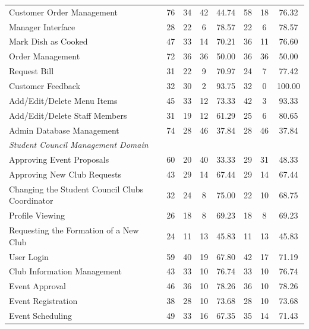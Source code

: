 \begin{landscape}
\begin{table}[h]
\begin{tabular}{lccccccc}
Customer Order Management & 76 & 34 & 42 & 44.74 & 58 & 18 & 76.32 \\
Manager Interface & 28 & 22 & 6 & 78.57 & 22 & 6 & 78.57 \\
Mark Dish as Cooked & 47 & 33 & 14 & 70.21 & 36 & 11 & 76.60 \\
Order Management & 72 & 36 & 36 & 50.00 & 36 & 36 & 50.00 \\
Request Bill & 31 & 22 & 9 & 70.97 & 24 & 7 & 77.42 \\
Customer Feedback & 32 & 30 & 2 & 93.75 & 32 & 0 & 100.00 \\
Add/Edit/Delete Menu Items & 45 & 33 & 12 & 73.33 & 42 & 3 & 93.33 \\
Add/Edit/Delete Staff Members & 31 & 19 & 12 & 61.29 & 25 & 6 & 80.65 \\
Admin Database Management & 74 & 28 & 46 & 37.84 & 28 & 46 & 37.84 \\
\midrule
\multicolumn{8}{l}{\textit{Student Council Management Domain}} \\
Approving Event Proposals & 60 & 20 & 40 & 33.33 & 29 & 31 & 48.33 \\
Approving New Club Requests & 43 & 29 & 14 & 67.44 & 29 & 14 & 67.44 \\
Changing the Student Council Clubs Coordinator & 32 & 24 & 8 & 75.00 & 22 & 10 & 68.75 \\
Profile Viewing & 26 & 18 & 8 & 69.23 & 18 & 8 & 69.23 \\
Requesting the Formation of a New Club & 24 & 11 & 13 & 45.83 & 11 & 13 & 45.83 \\
User Login & 59 & 40 & 19 & 67.80 & 42 & 17 & 71.19 \\
Club Information Management & 43 & 33 & 10 & 76.74 & 33 & 10 & 76.74 \\
Event Approval & 46 & 36 & 10 & 78.26 & 36 & 10 & 78.26 \\
Event Registration & 38 & 28 & 10 & 73.68 & 28 & 10 & 73.68 \\
Event Scheduling & 49 & 33 & 16 & 67.35 & 35 & 14 & 71.43 \\
\bottomrule
\end{tabular}
\end{table}
\end{landscape}
